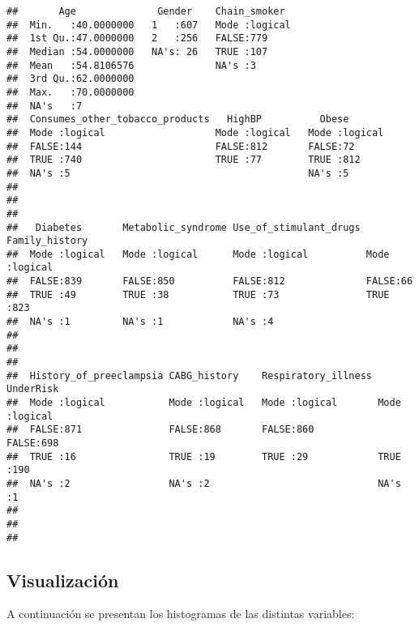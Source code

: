 \documentclass[
  spanish,
]{article}
\begin{document}
\begin{verbatim}
##       Age              Gender    Chain_smoker   
##  Min.   :40.0000000   1   :607   Mode :logical  
##  1st Qu.:47.0000000   2   :256   FALSE:779      
##  Median :54.0000000   NA's: 26   TRUE :107      
##  Mean   :54.8106576              NA's :3        
##  3rd Qu.:62.0000000                             
##  Max.   :70.0000000                             
##  NA's   :7                                      
##  Consumes_other_tobacco_products   HighBP          Obese        
##  Mode :logical                   Mode :logical   Mode :logical  
##  FALSE:144                       FALSE:812       FALSE:72       
##  TRUE :740                       TRUE :77        TRUE :812      
##  NA's :5                                         NA's :5        
##                                                                 
##                                                                 
##                                                                 
##   Diabetes       Metabolic_syndrome Use_of_stimulant_drugs Family_history 
##  Mode :logical   Mode :logical      Mode :logical          Mode :logical  
##  FALSE:839       FALSE:850          FALSE:812              FALSE:66       
##  TRUE :49        TRUE :38           TRUE :73               TRUE :823      
##  NA's :1         NA's :1            NA's :4                               
##                                                                           
##                                                                           
##                                                                           
##  History_of_preeclampsia CABG_history    Respiratory_illness UnderRisk      
##  Mode :logical           Mode :logical   Mode :logical       Mode :logical  
##  FALSE:871               FALSE:868       FALSE:860           FALSE:698      
##  TRUE :16                TRUE :19        TRUE :29            TRUE :190      
##  NA's :2                 NA's :2                             NA's :1        
##                                                                             
##                                                                             
## 
\end{verbatim}

\hypertarget{visualizaciuxf3n}{%
\subsection{Visualización}\label{visualizaciuxf3n}}

A continuación se presentan los histogramas de las distintas variables:
\end{document}
